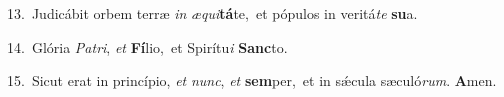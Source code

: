 {\numbfont\textcolor{\numbcolor}{13.}}~Judicábit orbem terræ \textit{in} \textit{æ}\-\textit{qui}\textbf{tá}te,~\star et pópulos in veritá\textit{te} \textbf{su}\-a.\par
{\numbfont\textcolor{\numbcolor}{14.}}~Glória \textit{Pa}\-\textit{tri}, \textit{et} \textbf{Fí}\-lio,~\star et Spirítu\textit{i} \textbf{Sanc}\-to.\par
{\numbfont\textcolor{\numbcolor}{15.}}~Sicut erat in princípio, \textit{et} \textit{nunc}\-, \textit{et} \textbf{sem}\-per,~\star et in sǽcula sæculó\-\textit{rum}\-. \textbf{A}\-men.\par
